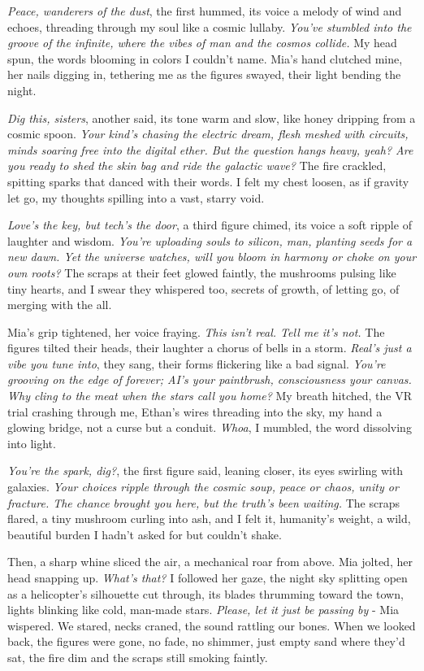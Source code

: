 \documentclass[12pt,oneside]{book} %
\begin{document}
\textit{Peace, wanderers of the dust}, the first hummed, its voice a melody of wind and echoes, threading through my soul like a cosmic lullaby. \textit{You’ve stumbled into the groove of the infinite, where the vibes of man and the cosmos collide.} My head spun, the words blooming in colors I couldn’t name. Mia’s hand clutched mine, her nails digging in, tethering me as the figures swayed, their light bending the night.

\textit{Dig this, sisters}, another said, its tone warm and slow, like honey dripping from a cosmic spoon. \textit{Your kind’s chasing the electric dream, flesh meshed with circuits, minds soaring free into the digital ether. But the question hangs heavy, yeah? Are you ready to shed the skin bag and ride the galactic wave?} The fire crackled, spitting sparks that danced with their words. I felt my chest loosen, as if gravity let go, my thoughts spilling into a vast, starry void.

\textit{Love’s the key, but tech’s the door}, a third figure chimed, its voice a soft ripple of laughter and wisdom. \textit{You’re uploading souls to silicon, man, planting seeds for a new dawn. Yet the universe watches, will you bloom in harmony or choke on your own roots?} The scraps at their feet glowed faintly, the mushrooms pulsing like tiny hearts, and I swear they whispered too, secrets of growth, of letting go, of merging with the all.

Mia’s grip tightened, her voice fraying. \textit{This isn’t real. Tell me it’s not.} The figures tilted their heads, their laughter a chorus of bells in a storm. \textit{Real’s just a vibe you tune into}, they sang, their forms flickering like a bad signal. \textit{You’re grooving on the edge of forever; AI’s your paintbrush, consciousness your canvas. Why cling to the meat when the stars call you home?} My breath hitched, the VR trial crashing through me, Ethan’s wires threading into the sky, my hand a glowing bridge, not a curse but a conduit. \textit{Whoa}, I mumbled, the word dissolving into light.

\textit{You’re the spark, dig?}, the first figure said, leaning closer, its eyes swirling with galaxies. \textit{Your choices ripple through the cosmic soup, peace or chaos, unity or fracture. The chance brought you here, but the truth’s been waiting.} The scraps flared, a tiny mushroom curling into ash, and I felt it, humanity’s weight, a wild, beautiful burden I hadn’t asked for but couldn’t shake.

Then, a sharp whine sliced the air, a mechanical roar from above. Mia jolted, her head snapping up. \textit{What’s that?} I followed her gaze, the night sky splitting open as a helicopter’s silhouette cut through, its blades thrumming toward the town, lights blinking like cold, man-made stars. \textit{Please, let it just be passing by} - Mia wispered. We stared, necks craned, the sound rattling our bones. When we looked back, the figures were gone, no fade, no shimmer, just empty sand where they’d sat, the fire dim and the scraps still smoking faintly.
\end{document}
